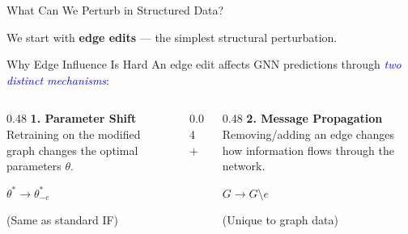 \documentclass[aspectratio=169]{beamer}
\renewcommand{\emph}[1]{\textit{\textcolor{blue}{#1}}}
\begin{document}
\begin{frame}{What Can We Perturb in Structured Data?}
    \vspace{0.1cm}
    \centerline{\small We start with \textbf{edge edits} --- the simplest structural perturbation.}
\end{frame}

\begin{frame}{Why Edge Influence Is Hard}
    An edge edit affects GNN predictions through \emph{two distinct mechanisms}:

    \vspace{0.5cm}
    \begin{columns}[c]
    \begin{column}{0.48\textwidth}
        \centering
        \textbf{1. Parameter Shift}\\
        \vspace{0.3cm}
        Retraining on the modified graph changes the optimal parameters $\theta$.

        \vspace{0.3cm}
        $\theta^* \to \theta^*_{-e}$

        \vspace{0.3cm}
        {\small (Same as standard IF)}
    \end{column}
    \pause
    \begin{column}{0.04\textwidth}
        \centering
        \Large $+$
    \end{column}
    \begin{column}{0.48\textwidth}
        \centering
        \textbf{2. Message Propagation}\\
        \vspace{0.3cm}
        Removing/adding an edge changes how information flows through the network.

        \vspace{0.3cm}
        $G \to G \setminus e$

        \vspace{0.3cm}
        {\small (Unique to graph data)}
    \end{column}
    \end{columns}

\end{frame}


\end{document}
